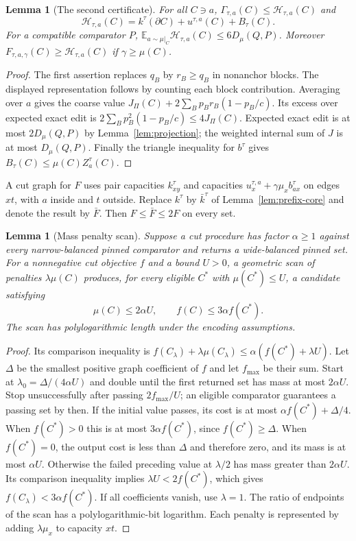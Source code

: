 \documentclass[11pt]{article}
\newtheorem{lemma}[theorem]{Lemma}
\theoremstyle{definition}
\newcommand{\E}{\mathbb E}
\newcommand{\cut}{\partial}
\begin{document}
\begin{lemma}[The second certificate]\label{lem:unary}
For all $C\ni a$, $\Gamma_{\tau,a}(C)\le\mathcal H_{\tau,a}(C)$ and
\[
 \mathcal H_{\tau,a}(C)=k^\tau(\cut C)+u^{\tau,a}(C)+B_\tau(C).
\]
For a compatible comparator $P$,
$\E_{a\sim\mu|_C}\mathcal H_{\tau,a}(C)\le6D_\mu(Q,P)$.
Moreover $F_{\tau,a,\gamma}(C)\ge\mathcal H_{\tau,a}(C)$ if
$\gamma\ge\mu(C)$.
\end{lemma}
\begin{proof}
The first assertion replaces $q_B$ by $r_B\ge q_B$ in nonanchor blocks.
The displayed representation follows by counting each block contribution.
Averaging over $a$ gives the coarse value
$J_\Pi(C)+2\sum_Bp_Br_B(1-p_B/c)$.
Its excess over expected exact edit is
$2\sum_Bp_B^2(1-p_B/c)\le4J_\Pi(C)$.
Expected exact edit is at most $2D_\mu(Q,P)$ by
Lemma~\ref{lem:projection}; the weighted internal sum of $J$ is at most
$D_\mu(Q,P)$. Finally the triangle inequality for $b^\tau$ gives
$B_\tau(C)\le\mu(C)Z^\tau_a(C)$.
\end{proof}

A cut graph for $F$ uses pair capacities $k^\tau_{xy}$ and capacities
$u^{\tau,a}_x+\gamma\mu_xb^\tau_{ax}$ on edges $xt$, with $a$ inside
and $t$ outside. Replace $k^\tau$ by $\bar k^\tau$ of
Lemma~\ref{lem:prefix-core} and denote the result by $\bar F$.
Then $F\le\bar F\le2F$ on every set.

\begin{lemma}[Mass penalty scan]\label{lem:mass}
Suppose a cut procedure has factor $\alpha\ge1$ against every
narrow-balanced pinned comparator and returns a wide-balanced pinned set.
For a nonnegative cut objective $f$ and a bound $U>0$, a geometric scan
of penalties $\lambda\mu(C)$ produces, for every eligible $C^*$ with
$\mu(C^*)\le U$, a candidate satisfying
\[
 \mu(C)\le2\alpha U,\qquad f(C)\le3\alpha f(C^*).
\]
The scan has polylogarithmic length under the encoding assumptions.
\end{lemma}
\begin{proof}
Its comparison inequality is
$f(C_\lambda)+\lambda\mu(C_\lambda)
 \le\alpha(f(C^*)+\lambda U)$.
Let $\Delta$ be the smallest positive graph coefficient of $f$ and let
$f_{\max}$ be their sum. Start at $\lambda_0=\Delta/(4\alpha U)$
and double until the first returned set has mass at most $2\alpha U$.
Stop unsuccessfully after passing $2f_{\max}/U$; an eligible comparator
guarantees a passing set by then.
If the initial value passes, its cost is at most
$\alpha f(C^*)+\Delta/4$. When $f(C^*)>0$ this is at most
$3\alpha f(C^*)$, since $f(C^*)\ge\Delta$. When $f(C^*)=0$,
the output cost is less than $\Delta$ and therefore zero, and its mass
is at most $\alpha U$.
Otherwise the failed preceding value at $\lambda/2$ has mass greater
than $2\alpha U$. Its comparison inequality implies
$\lambda U<2f(C^*)$, which gives $f(C_\lambda)<3\alpha f(C^*)$.
If all coefficients vanish, use $\lambda=1$.
The ratio of endpoints of the scan has a polylogarithmic-bit logarithm.
Each penalty is represented by adding $\lambda\mu_x$ to capacity $xt$.
\end{proof}
\end{document}
